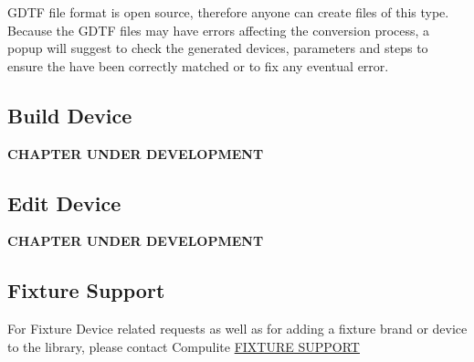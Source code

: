 \documentclass[
]{article}
\begin{document}
GDTF file format is open source, therefore anyone can create files of this type. Because the GDTF files may have errors affecting the conversion process, a popup will suggest to check the generated devices, parameters and steps to ensure the have been correctly matched or to fix any eventual error.

\hypertarget{build-device}{%
\subsection{Build Device}\label{build-device}}

{\textbf{CHAPTER UNDER DEVELOPMENT}}

\hypertarget{edit-device}{%
\subsection{Edit Device}\label{edit-device}}

{\textbf{CHAPTER UNDER DEVELOPMENT}}

\hypertarget{fixture-support}{%
\subsection{Fixture Support}\label{fixture-support}}

For Fixture Device related requests as well as for adding a fixture brand or device to the library, please contact Compulite \href{mailto:fixturesupport@compulite.com}{FIXTURE SUPPORT}
\end{document}
